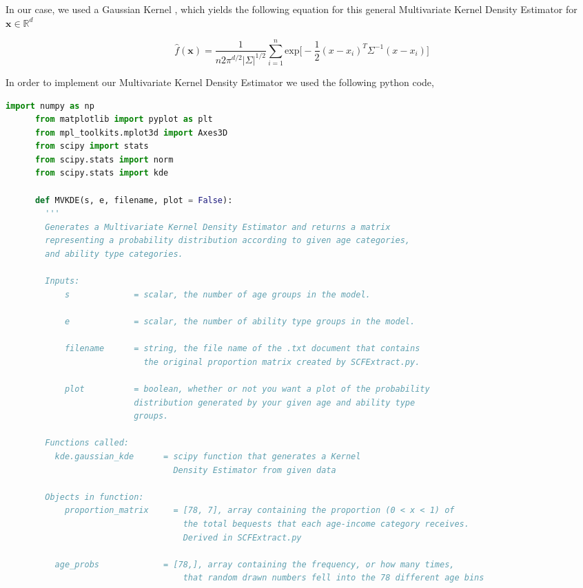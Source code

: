 \documentclass[letterpaper,12pt]{article}
\theoremstyle{definition}
\begin{document}
\begin{spacing}{1.5}
    In our case, we used a Gaussian Kernel , which yields the following equation for this general Multivariate Kernel Density Estimator for $\mathbf{x} \in \mathbb{R}^d$

    \[\hat{f}(\mathbf{x}) = \frac{1}{n2\pi ^{d/2} |\Sigma|^{1/2}} \sum_{i=1}^n \text{exp}\big[-\frac{1}{2}(x-x_i)^T\Sigma ^{-1}(x-x_i)\big]\]
    \citet{Scott:2005}

    In order to implement our Multivariate Kernel Density Estimator we used the following python code,\\

    \begin{lstlisting}[language=Python, caption=MVKDE.py]
      import numpy as np
      from matplotlib import pyplot as plt
      from mpl_toolkits.mplot3d import Axes3D
      from scipy import stats
      from scipy.stats import norm
      from scipy.stats import kde

      def MVKDE(s, e, filename, plot = False):
        '''
        Generates a Multivariate Kernel Density Estimator and returns a matrix
        representing a probability distribution according to given age categories,
        and ability type categories.

        Inputs:
            s             = scalar, the number of age groups in the model.

            e             = scalar, the number of ability type groups in the model.

            filename      = string, the file name of the .txt document that contains
                            the original proportion matrix created by SCFExtract.py.

            plot          = boolean, whether or not you want a plot of the probability
                          distribution generated by your given age and ability type
                          groups.

        Functions called:
          kde.gaussian_kde      = scipy function that generates a Kernel
                                  Density Estimator from given data

        Objects in function:
            proportion_matrix     = [78, 7], array containing the proportion (0 < x < 1) of
                                    the total bequests that each age-income category receives.
                                    Derived in SCFExtract.py

          age_probs             = [78,], array containing the frequency, or how many times,
                                    that random drawn numbers fell into the 78 different age bins


\end{lstlisting}
\end{spacing}
\end{document}
